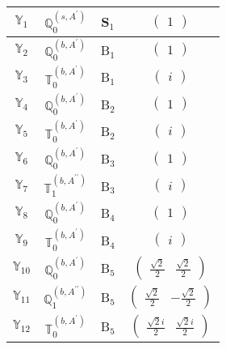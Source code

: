 \documentclass[fleqn,10pt,landscape]{article}
\begin{document}
\begin{itemize}
\begin{center}
\begin{longtable}{c|c|c|c}
$ \mathbb{Y}_{1} $ & $\mathbb{Q}_{0}^{(s,A^{\prime})}$ & S$_{1}$ & $\begin{pmatrix} 1 \end{pmatrix}$ \\ \hline
$ \mathbb{Y}_{2} $ & $\mathbb{Q}_{0}^{(b,A^{\prime})}$ & B$_{1}$ & $\begin{pmatrix} 1 \end{pmatrix}$ \\
$ \mathbb{Y}_{3} $ & $\mathbb{T}_{0}^{(b,A^{\prime})}$ & B$_{1}$ & $\begin{pmatrix} i \end{pmatrix}$ \\ \hline
$ \mathbb{Y}_{4} $ & $\mathbb{Q}_{0}^{(b,A^{\prime})}$ & B$_{2}$ & $\begin{pmatrix} 1 \end{pmatrix}$ \\
$ \mathbb{Y}_{5} $ & $\mathbb{T}_{0}^{(b,A^{\prime})}$ & B$_{2}$ & $\begin{pmatrix} i \end{pmatrix}$ \\ \hline
$ \mathbb{Y}_{6} $ & $\mathbb{Q}_{0}^{(b,A^{\prime})}$ & B$_{3}$ & $\begin{pmatrix} 1 \end{pmatrix}$ \\
$ \mathbb{Y}_{7} $ & $\mathbb{T}_{1}^{(b,A^{\prime\prime})}$ & B$_{3}$ & $\begin{pmatrix} i \end{pmatrix}$ \\ \hline
$ \mathbb{Y}_{8} $ & $\mathbb{Q}_{0}^{(b,A^{\prime})}$ & B$_{4}$ & $\begin{pmatrix} 1 \end{pmatrix}$ \\
$ \mathbb{Y}_{9} $ & $\mathbb{T}_{0}^{(b,A^{\prime})}$ & B$_{4}$ & $\begin{pmatrix} i \end{pmatrix}$ \\ \hline
$ \mathbb{Y}_{10} $ & $\mathbb{Q}_{0}^{(b,A^{\prime})}$ & B$_{5}$ & $\begin{pmatrix} \frac{\sqrt{2}}{2} & \frac{\sqrt{2}}{2} \end{pmatrix}$ \\
$ \mathbb{Y}_{11} $ & $\mathbb{Q}_{1}^{(b,A^{\prime\prime})}$ & B$_{5}$ & $\begin{pmatrix} \frac{\sqrt{2}}{2} & - \frac{\sqrt{2}}{2} \end{pmatrix}$ \\
$ \mathbb{Y}_{12} $ & $\mathbb{T}_{0}^{(b,A^{\prime})}$ & B$_{5}$ & $\begin{pmatrix} \frac{\sqrt{2} i}{2} & \frac{\sqrt{2} i}{2} \end{pmatrix}$ \\

\end{longtable}
\end{center}
\end{itemize}
\end{document}
